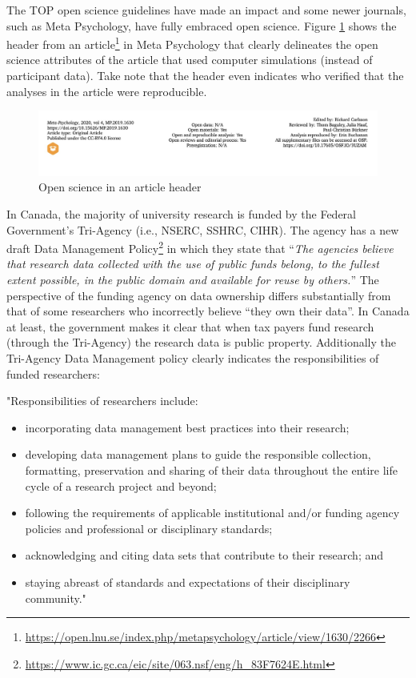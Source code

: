 \documentclass[
]{krantz}
\providecommand{\tightlist}{%
  \setlength{\itemsep}{0pt}\setlength{\parskip}{0pt}}
\renewcommand{\href}[2]{#2\footnote{\url{#1}}}
\begin{document}
The TOP open science guidelines have made an impact and some newer journals, such as Meta Psychology, have fully embraced open science. Figure \ref{fig:metapsychology} shows the header from an \href{https://open.lnu.se/index.php/metapsychology/article/view/1630/2266}{article} in Meta Psychology that clearly delineates the open science attributes of the article that used computer simulations (instead of participant data). Take note that the header even indicates who verified that the analyses in the article were reproducible.

\begin{figure}
\includegraphics[width=1\linewidth]{ch_enter_load/images/screenshot_metapsychology} \caption{Open science in an article header}\label{fig:metapsychology}
\end{figure}

In Canada, the majority of university research is funded by the Federal Government's Tri-Agency (i.e., NSERC, SSHRC, CIHR). The agency has a new draft \href{https://www.ic.gc.ca/eic/site/063.nsf/eng/h_83F7624E.html}{Data Management Policy} in which they state that ``\emph{The agencies believe that research data collected with the use of public funds belong, to the fullest extent possible, in the public domain and available for reuse by others.}'' The perspective of the funding agency on data ownership differs substantially from that of some researchers who incorrectly believe ``they own their data''. In Canada at least, the government makes it clear that when tax payers fund research (through the Tri-Agency) the research data is public property. Additionally the Tri-Agency Data Management policy clearly indicates the responsibilities of funded researchers:

"Responsibilities of researchers include:

\begin{itemize}
\tightlist
\item
  incorporating data management best practices into their research;
\item
  developing data management plans to guide the responsible collection, formatting, preservation and sharing of their data throughout the entire life cycle of a research project and beyond;
\item
  following the requirements of applicable institutional and/or funding agency policies and professional or disciplinary standards;
\item
  acknowledging and citing data sets that contribute to their research; and
\item
  staying abreast of standards and expectations of their disciplinary community."
\end{itemize}
\end{document}
